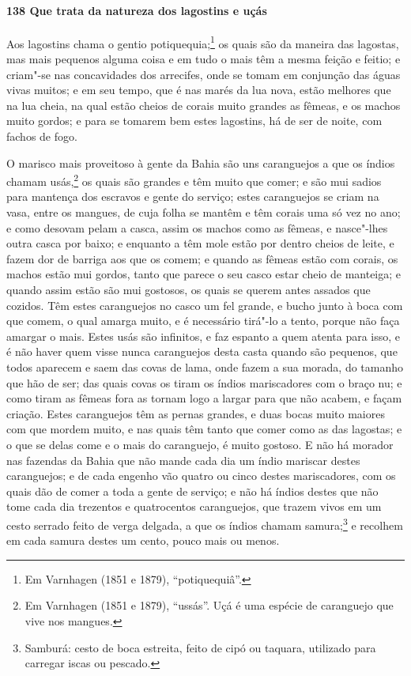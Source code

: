 \begin{linenumbers}
\paragraph{138 Que trata da natureza dos lagostins e uçás}\quad
Aos lagostins chama o gentio potiquequia;\footnote{ Em Varnhagen (1851 e 1879),
``potiquequiâ''.} os quais são da maneira das lagostas, mas mais pequenos alguma coisa e
em tudo o mais têm a mesma feição e feitio; e criam"-se nas concavidades dos arrecifes,
onde se tomam em conjunção das águas vivas muitos; e em seu tempo, que é nas marés da lua
nova, estão melhores que na lua cheia, na qual estão cheios de corais muito grandes as
fêmeas, e os machos muito gordos; e para se tomarem bem estes lagostins, há de ser de
noite, com fachos de fogo.

O marisco mais proveitoso à gente da Bahia são uns caranguejos a que os índios chamam
usás,\footnote{ Em Varnhagen (1851 e 1879), ``ussás''. Uçá é uma espécie de caranguejo que
vive nos mangues.} os quais são grandes e têm muito que comer; e são mui sadios para
mantença dos escravos e gente do serviço; estes caranguejos se criam na vasa, entre os
mangues, de cuja folha se mantêm e têm corais uma só vez no ano; e como desovam pelam a
casca, assim os machos como as fêmeas, e nasce"-lhes outra casca por baixo; e enquanto a
têm mole estão por dentro cheios de leite, e fazem dor de barriga aos que os comem; e
quando as fêmeas estão com corais, os machos estão mui gordos, tanto que parece o seu
casco estar cheio de manteiga; e quando assim estão são mui gostosos, os quais se querem
antes assados que cozidos. Têm estes caranguejos no casco um fel grande, e bucho junto à
boca com que comem, o qual amarga muito, e é necessário tirá"-lo a tento, porque não faça
amargar o mais. Estes usás são infinitos, e faz espanto a quem atenta para isso, e é não
haver quem visse nunca caranguejos desta casta quando são pequenos, que todos aparecem e
saem das covas de lama, onde fazem a sua morada, do tamanho que hão de ser; das quais
covas os tiram os índios mariscadores com o braço nu; e como tiram as fêmeas fora as
tornam logo a largar para que não acabem, e façam criação. Estes caranguejos têm as pernas
grandes, e duas bocas muito maiores com que mordem muito, e nas quais têm tanto que comer
como as das lagostas; e o que se delas come e o mais do caranguejo, é muito gostoso. E não
há morador nas fazendas da Bahia que não mande cada dia um índio mariscar destes
caranguejos; e de cada engenho vão quatro ou cinco destes mariscadores, com os quais dão
de comer a toda a gente de serviço; e não há índios destes que não tome cada dia trezentos
e quatrocentos caranguejos, que trazem vivos em um cesto serrado feito de verga delgada, a
que os índios chamam samura;\footnote{ Samburá: cesto de boca estreita, feito de cipó ou
taquara, utilizado para carregar iscas ou pescado.} e recolhem em cada samura destes um
cento, pouco mais ou menos.


\end{linenumbers}
